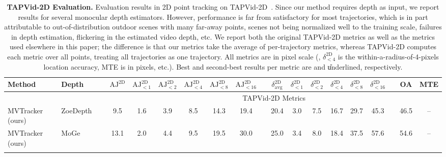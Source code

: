 \begin{table}
\setlength{\tabcolsep}{2pt}
\centering
\caption{\textbf{TAPVid-2D Evaluation.} Evaluation results in 2D point tracking on TAPVid-2D~\cite{doersch2023tapvid}. Since our method requires depth as input, we report results for several monocular depth estimators. However, performance is far from satisfactory for most trajectories, which is in part attributable to out-of-distribution outdoor scenes with many far-away points, scenes not being normalized well to the training scale, failures in depth estimation, flickering in the estimated video depth, etc. We report both the original TAPVid-2D metrics as well as the metrics used elsewhere in this paper; the difference is that our metrics take the average of per-trajectory metrics, whereas TAPVid-2D computes each metric over all points, treating all trajectories as one trajectory. All metrics are in pixel scale (\eg, $\delta_{< 4}^{\text{2D}}$ is the within-a-radius-of-4-pixels location accuracy, MTE is in pixels, etc.). Best and second-best results per metric are  and \U{underlined}, respectively.}
\vspace{-0.2cm}
\begin{tabular}{ll c cccccc c cccccc c cc}
\toprule
Method
& Depth
& \hspace{1ex}
& {\scriptsize $\text{AJ}      ^{\text{2D}}$ }
& {\scriptsize $\text{AJ}_{< 1}^{\text{2D}}$ }
& {\scriptsize $\text{AJ}_{< 2}^{\text{2D}}$ }
& {\scriptsize $\text{AJ}_{< 4}^{\text{2D}}$ }
& {\scriptsize $\text{AJ}_{< 8}^{\text{2D}}$ }
& {\scriptsize $\text{AJ}_{<16}^{\text{2D}}$ }
& \hspace{1ex}
& {\scriptsize $\delta_\text{avg}^{\text{2D}}$ }
& {\scriptsize $\delta_{< 1}^{\text{2D}}$ }
& {\scriptsize $\delta_{< 2}^{\text{2D}}$ }
& {\scriptsize $\delta_{< 4}^{\text{2D}}$ }
& {\scriptsize $\delta_{< 8}^{\text{2D}}$ }
& {\scriptsize $\delta_{<16}^{\text{2D}}$ }
& \hspace{1ex}
& {\scriptsize OA }
& {\scriptsize MTE }
\\
\midrule
&&&\multicolumn{16}{c}{TAPVid-2D Metrics} \\
\midrule \rowcolor{cyan!16}
MVTracker (ours) & ZoeDepth~\cite{bhat2023zoedepth} &&     9.5  &     1.6  &     3.9  &     8.5  &    14.3  &    19.4  &&    20.4  &     3.0  &     7.5  &    16.7  &    29.7  &    45.3  &&    46.5  &     --  \\ \rowcolor{cyan!16}
MVTracker (ours) & MoGe~\cite{wang2025moge}         &&    13.1  &     2.0  &     4.4  &     9.5  &    19.5  &    30.0  &&    25.0  &     3.4  &     8.0  &    18.4  &    37.5  &    57.6  &&    54.6  &     --  \\ \rowcolor{cyan!16}

\end{tabular}
\end{table}
